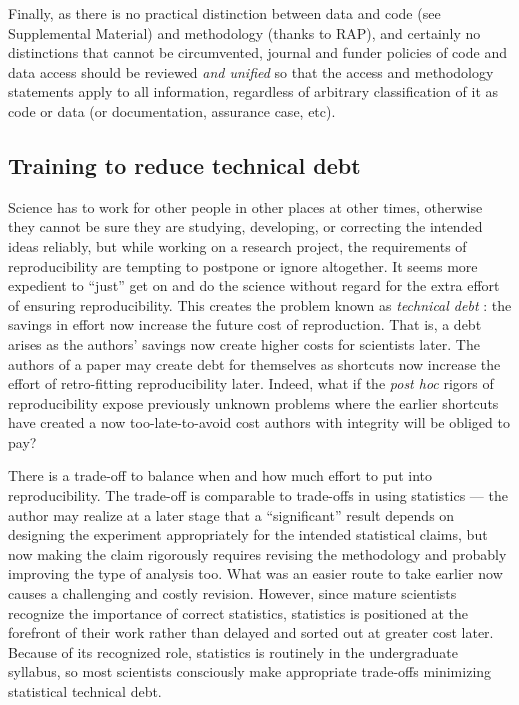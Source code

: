 \documentclass{comjnl}
\def\supplement{Supplemental Material}
\begin{document}
Finally, as there is no practical distinction between data and code (see \supplement) and methodology (thanks to RAP), and certainly no distinctions that cannot be circumvented, journal and funder policies of code and data access should be reviewed \emph{and unified\/} so that the access and methodology statements apply to all information, regardless of arbitrary classification of it as code or data (or documentation, assurance case, etc).

\subsection{Training to reduce technical debt}\label{technical-debt}
Science has to work for other people in other places at other times, otherwise they cannot be sure they are studying, developing, or correcting the intended ideas reliably, but while working on a research project, the requirements of reproducibility are tempting to postpone or ignore altogether. It seems more expedient to ``just'' get on and do the science without regard for the extra effort of ensuring reproducibility. This creates the problem known as \emph{technical debt} \cite{debt}: the savings in effort now increase the future cost of reproduction. That is, a debt arises as the authors' savings now create higher costs for scientists later. The authors of a paper may create debt for themselves as shortcuts now increase the effort of retro-fitting reproducibility later. Indeed, what if the \emph{post hoc\/} rigors of reproducibility expose previously unknown problems where the earlier shortcuts have created a now too-late-to-avoid cost authors with integrity will be obliged to pay?

There is a trade-off to balance when and how much effort to put into reproducibility. The trade-off is comparable to trade-offs in using statistics --- the author may realize at a later stage that a ``significant'' result depends on designing the experiment appropriately for the intended statistical claims, but now making the claim rigorously requires revising the methodology and probably improving the type of analysis too. What was an easier route to take earlier now causes a challenging and costly revision. However, since mature scientists recognize the importance of correct statistics, statistics is positioned at the forefront of their work rather than delayed and sorted out at greater cost later. Because of its recognized role, statistics is routinely in the undergraduate syllabus, so most scientists consciously make appropriate trade-offs minimizing statistical technical debt.
 
\end{document}
